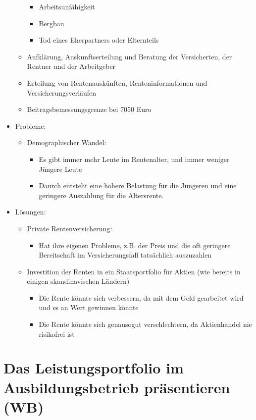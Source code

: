 \documentclass[a4paper, 12pt]{report}
\begin{document}
\begin{multicols}{2}
\begin{itemize}
\begin{itemize}
\begin{itemize}
		    \item Arbeitsunfähigkeit
		    \item Bergbau
		    \item Tod eines Eherpartners oder Elternteils
		\end{itemize}
	    \item Aufklärung, Auskunftserteilung und Beratung der Versicherten,
		der Rentner und der Arbeitgeber
	    \item Erteilung von Rentenauskünften, Renteninformationen und
		Versicherungsverläufen
	    \item Beitragsbemessungsgrenze bei 7050 Euro
	\end{itemize}
    \item Probleme:
	\begin{itemize}
	    \item Demographischer Wandel:
		\begin{itemize}
		    \item Es gibt immer mehr Leute im Rentenalter, und immer
			weniger Jüngere Leute
		    \item Daurch entsteht eine höhere Belastung für die Jüngeren
			und eine geringere Auszahlung für die Altersrente.
		\end{itemize}
	\end{itemize}
    \item Lösungen:
	\begin{itemize}
	    \item Private Rentenversicherung:
		\begin{itemize}
		    \item Hat ihre eigenen Probleme, z.B. der Preis und die oft
			geringere Bereitschaft im Versicherungsfall tatsächlich
			auszuzahlen
		\end{itemize}
	    \item Investition der Renten in ein Staatsportfolio für Aktien (wie
		bereits in einigen skandinavischen Ländern)
		\begin{itemize}
		    \item Die Rente könnte sich verbessern, da mit dem Geld
			gearbeitet wird und es an Wert gewinnen könnte
		    \item Die Rente könnte sich genausogut verschlechtern, da
			Aktienhandel nie risikofrei ist
		\end{itemize}
	\end{itemize}
\end{itemize}

\section{Das Leistungsportfolio im Ausbildungsbetrieb präsentieren (WB)}


\end{multicols}
\end{document}
